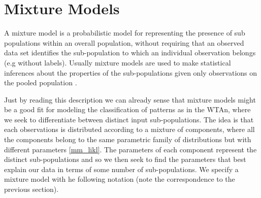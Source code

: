 \documentclass{article}
\begin{document}
\section{Mixture Models}
A mixture model is a probabilistic model for representing the presence
of sub populations within an overall population, without requiring that
an observed data set identifies the sub-population to which an
individual observation belongs (e.g without labels). Usually mixture models are used to make
statistical inferences about the properties of the sub-populations given
only observations on the pooled population \cite{Mixture_model}.

Just by reading this description we can already sense that mixture
models might be a good fit for modeling the classification of patterns as
in the WTAn, where we seek to differentiate between distinct input sub-populations. The idea is
that each observations is distributed according to a mixture of components, where all the components belong to the same parametric family of distributions but with different parameters \eqref{mm_likl}. The parameters of each component represent the distinct sub-populations and so we then seek to find the parameters that best explain our data in terms of some number of sub-populations. We specify a mixture model with he following notation (note the correspondence to the previous section).
\end{document}
